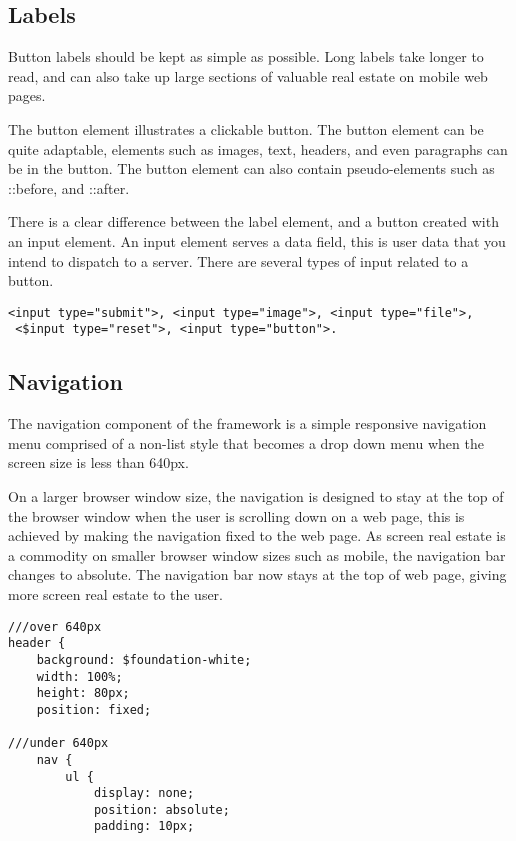 \subsection*{Labels}
Button labels should be kept as simple as possible. Long labels take longer to read, and can also take up large sections of valuable real estate on mobile web pages. 

The button element illustrates a clickable button. The button element can be quite adaptable, elements such as images, text, headers, and even paragraphs can be in the button. The button element can also contain pseudo-elements such as ::before, and ::after. 

There is a clear difference between the label element, and a button created with an input element. An input element serves a data field, this is user data that you intend to dispatch to a server. There are several types of input related to a button.

\begin{lstlisting}[language=CSS3]
 <input type="submit">, <input type="image">, <input type="file">, 
 <$input type="reset">, <input type="button">. 
\end{lstlisting}


\newpage
\subsection*{Navigation}
The navigation component of the framework is a simple responsive navigation menu  comprised of a non-list style that becomes a drop down menu when the screen size is less than 640px.

On a larger browser window size, the navigation is designed to stay at the top of the browser window when the user is scrolling down on a web page, this is achieved by making the navigation fixed to the web page. As screen real estate is a commodity on smaller browser window sizes such as mobile, the navigation bar changes to absolute. The navigation bar now stays at the top of web page, giving more screen real estate to the user. 

\begin{lstlisting}[language=CSS3]
///over 640px
header {
	background: $foundation-white;
	width: 100%;
	height: 80px;
	position: fixed; 
	
///under 640px			
	nav {
		ul {
			display: none;
			position: absolute;
			padding: 10px;
\end{lstlisting}

